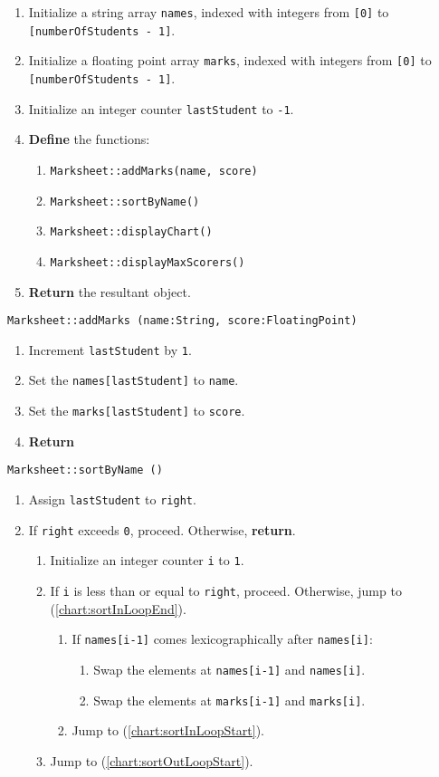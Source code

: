 \begin{enumerate}
	\item	Initialize a string array {\tt names}, indexed with integers from {\tt [0]} to {\tt [numberOfStudents - 1]}.
	\item	Initialize a floating point array {\tt marks}, indexed with integers from {\tt [0]} to 
			{\tt [numberOfStudents - 1]}.
	\item	Initialize an integer counter {\tt lastStudent} to {\tt -1}.
	\item	{\bf Define} the functions: 
	\begin{enumerate}
		\item	{\tt Marksheet::addMarks(name, score)}
		\item	{\tt Marksheet::sortByName()}
		\item	{\tt Marksheet::displayChart()}
		\item	{\tt Marksheet::displayMaxScorers()}
	\end{enumerate}
	\item	{\bf Return} the resultant object.
\end{enumerate}
\vspace{5mm}
{\tt Marksheet::addMarks (name:String, score:FloatingPoint)}
\begin{enumerate}
	\item	Increment {\tt lastStudent} by {\tt 1}.
	\item	Set the {\tt names[lastStudent]} to {\tt name}.
	\item	Set the {\tt marks[lastStudent]} to {\tt score}.
	\item	{\bf Return}
\end{enumerate}
\vspace{5mm}
{\tt Marksheet::sortByName ()}
\begin{enumerate}
	\item	Assign {\tt lastStudent} to {\tt right}.
	\item	If {\tt right} exceeds {\tt 0}, proceed.
			Otherwise, {\bf return}. \label{chart:sortOutLoopStart}
		\begin{enumerate}
			\item	Initialize an integer counter {\tt i} to {\tt 1}.
			\item	If {\tt i} is less than or equal to {\tt right}, proceed.
					Otherwise, jump to (\ref{chart:sortInLoopEnd}). \label{chart:sortInLoopStart}
			\begin{enumerate}
				\item	If {\tt names[i-1]} comes lexicographically after {\tt names[i]}:
				\begin{enumerate}
					\item	Swap the elements at {\tt names[i-1]} and {\tt names[i]}.
					\item	Swap the elements at {\tt marks[i-1]} and {\tt marks[i]}.
				\end{enumerate}
				\item	Jump to (\ref{chart:sortInLoopStart}).
			\end{enumerate}
			\item	Jump to (\ref{chart:sortOutLoopStart}). \label{chart:sortInLoopEnd}
		\end{enumerate}
\end{enumerate}
